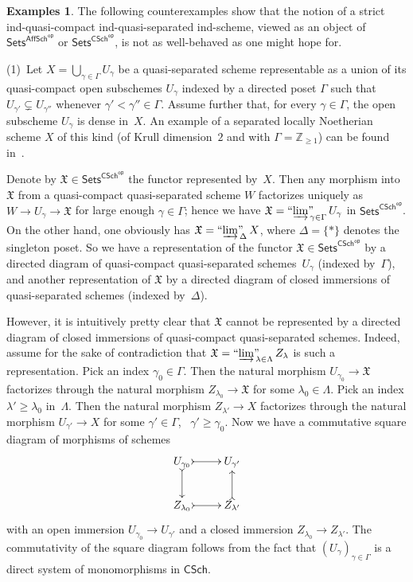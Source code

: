 \documentclass[12pt,a4paper]{amsart}
\newcommand{\+}{\protect\nobreakdash-}
\renewcommand{\:}{\colon}
\newcommand{\rarrow}{\longrightarrow}
\newcommand{\Sets}{\mathsf{Sets}}
\newcommand{\AffSch}{\mathsf{AffSch}}
\newcommand{\CSch}{\mathsf{CSch}}
\newcommand{\sop}{\mathsf{op}}
\newcommand{\ilim}
 {\mathop{\text{\normalfont``$\varinjlim$''\!\!}}\nolimits}
\newcommand{\fX}{\mathfrak X}
\newcommand{\boZ}{\mathbb Z}
\theoremstyle{plain}
\theoremstyle{definition}
\newtheorem{exs}[thm]{Examples}
\begin{document}
\begin{exs} \label{strict-ind-concentrated-counterexamples}
 The following counterexamples show that the notion of a strict
ind-quasi-compact ind-quasi-separated ind-scheme, viewed as an object
of $\Sets^{\AffSch^\sop}$ or $\Sets^{\CSch^\sop}$, is not as
well-behaved as one might hope for.

\smallskip
 (1)~Let $X=\bigcup_{\gamma\in\Gamma}U_\gamma$ be a quasi-separated
scheme representable as a union of its quasi-compact open subschemes
$U_\gamma$ indexed by a directed poset $\Gamma$ such that
$U_{\gamma'}\varsubsetneq U_{\gamma''}$ whenever
$\gamma'<\gamma''\in\Gamma$.
 Assume further that, for every $\gamma\in\Gamma$, the open
subscheme $U_\gamma$ is dense in~$X$.
 An example of a separated locally Noetherian scheme $X$ of this kind
(of Krull dimension~$2$ and with $\Gamma=\boZ_{\ge1}$) can be found
in~\cite[end of Section~II.7]{HarRD}.

 Denote by $\fX\in\Sets^{\CSch^\sop}$ the functor represented by~$X$.
 Then any morphism into $\fX$ from a quasi-compact quasi-separated
scheme $W$ factorizes uniquely as $W\rarrow U_\gamma\rarrow\fX$ for
large enough $\gamma\in\Gamma$; hence we have
$\fX=\ilim_{\gamma\in\Gamma}U_\gamma$ in $\Sets^{\CSch^\sop}$.
 On the other hand, one obviously has $\fX=\ilim_\Delta X$, where
$\Delta=\{*\}$ denotes the singleton poset.
 So we have a representation of the functor $\fX\in\Sets^{\CSch^\sop}$
by a directed diagram of quasi-compact quasi-separated
schemes~$U_\gamma$ (indexed by~$\Gamma$), and another representation
of $\fX$ by a directed diagram of closed immersions of quasi-separated
schemes (indexed by~$\Delta$).

 However, it is intuitively pretty clear that $\fX$ cannot be
represented by a directed diagram of closed immersions of
quasi-compact quasi-separated schemes.
 Indeed, assume for the sake of contradiction that
$\fX=\ilim_{\lambda\in\Lambda}Z_\lambda$ is such a representation.
 Pick an index $\gamma_0\in\Gamma$.
 Then the natural morphism $U_{\gamma_0}\rarrow\fX$ factorizes
through the natural morphism $Z_{\lambda_0}\rarrow\fX$ for some
$\lambda_0\in\Lambda$.
 Pick an index $\lambda'\ge\lambda_0$ in~$\Lambda$.
 Then the natural morphism $Z_{\lambda'}\rarrow X$
factorizes through the natural morphism $U_{\gamma'}\rarrow X$
for some $\gamma'\in\Gamma$, \ $\gamma'\ge\gamma_0$.
 Now we have a commutative square diagram of morphisms of schemes
$$
 \xymatrix{
  U_{\gamma_0} \ar@{>->}[r] \ar@{>->}[d] & U_{\gamma'} \\
  Z_{\lambda_0} \ar@{>->}[r]  & Z_{\lambda'} \ar@{>->}[u]
 }
$$
with an open immersion $U_{\gamma_0}\rarrow U_{\gamma'}$
and a closed immersion $Z_{\lambda_0}\rarrow Z_{\lambda'}$.
 The commutativity of the square diagram follows from the fact
that $(U_\gamma)_{\gamma\in\Gamma}$ is a direct system of
monomorphisms in $\CSch$.


\end{exs}
\end{document}

